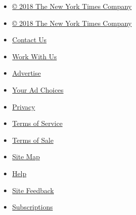 \begin{itemize}
\tightlist
\item
  \href{http://www.nytco.com}{© 2018 The New York Times Company}
\end{itemize}

\begin{itemize}
\tightlist
\item
  \href{http://www.nytco.com}{© 2018 The New York Times Company}
\item
  \href{http://www.nytimes3xbfgragh.onion/ref/membercenter/help/infoservdirectory.html}{Contact
  Us}
\item
  \href{http://www.nytco.com/careers}{Work With Us}
\item
  \href{http://www.nytimes.whsites.net/mediakit}{Advertise}
\item
  \href{http://www.nytimes3xbfgragh.onion/content/help/rights/privacy/policy/privacy-policy.html\#pp}{Your
  Ad Choices}
\item
  \href{http://www.nytimes3xbfgragh.onion/privacy}{Privacy}
\item
  \href{http://www.nytimes3xbfgragh.onion/ref/membercenter/help/agree.html}{Terms
  of Service}
\item
  \href{http://www.nytimes3xbfgragh.onion/content/help/rights/sale/terms-of-sale.html}{Terms
  of Sale}
\end{itemize}

\begin{itemize}
\tightlist
\item
  \href{http://spiderbites.nytimes3xbfgragh.onion}{Site Map}
\item
  \href{http://www.nytimes3xbfgragh.onion/membercenter/sitehelp.html}{Help}
\item
  \href{https://myaccount.nytimes3xbfgragh.onion/membercenter/feedback.html}{Site
  Feedback}
\item
  \href{http://www.nytimes3xbfgragh.onion/subscriptions/Multiproduct/lp5558.html?campaignId=37WXW}{Subscriptions}
\end{itemize}
